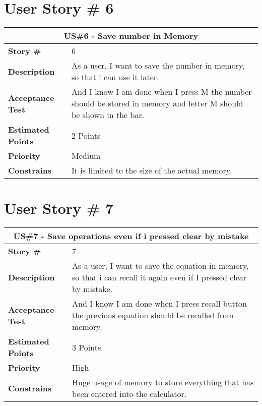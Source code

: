 \documentclass{report}
\begin{document}
\section{User Story \# 6}
\begin{tabular}{|p{3cm}|p{9cm}| }
\hline
\multicolumn{2}{|c|}{US\#6 - Save number in Memory} \\
\hline
\textbf {Story \#}& 6\\
\hline
\textbf{Description}& As a user, I want to save the number in memory, so that i can use it later.\\
\hline
\textbf{Acceptance Test}& And I know I am done when I press M  the number should be stored in memory and letter M should be shown in the bar. \\
\hline
\textbf{Estimated Points} & 2 Points \\
\hline
\textbf{Priority} & Medium \\
\hline
\textbf{Constrains}& It is limited to the size of the actual memory.\\
\hline
\end{tabular}

\section{User Story \# 7}
\begin{tabular}{|p{3cm}|p{9cm}| }
\hline
\multicolumn{2}{|c|}{US\#7 - Save operations even if i pressed clear by mistake} \\
\hline
\textbf {Story \#}& 7\\
\hline
\textbf{Description}& As a user, I want to save the equation in memory, so that i can recall it again even if I pressed clear by mistake.\\
\hline
\textbf{Acceptance Test}& And I know I am done when I press recall button the previous equation should be recalled from memory. \\
\hline
\textbf{Estimated Points} & 3 Points \\
\hline
\textbf{Priority} & High \\
\hline
\textbf{Constrains}& Huge usage of memory to store everything that has been entered into the calculator.\\
\hline
\end{tabular}
\end{document}
